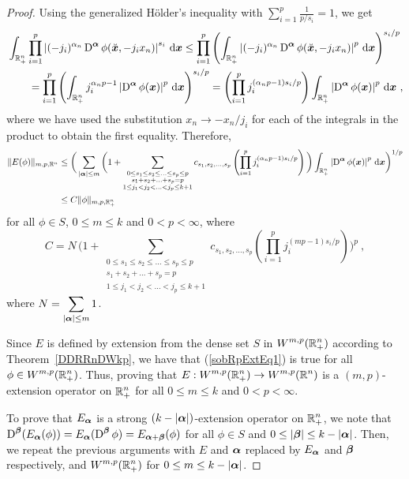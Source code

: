 \begin{proof}
Using the generalized Hölder's inequality with
$\displaystyle \sum_{i=1}^p \frac{1}{p/s_i} = 1$, we get
\begin{align*}
&\int_{\mathbb{R}^n_+} \prod_{i=1}^p \left| (-j_i)^{\alpha_n} \operatorname{D}^{{\bm{\alpha}}}
\phi(\breve{{\bm{x}}},-j_i x_n)\right|^{s_i} \,\mathrm{d}{{\bm{x}}}
\leq \prod_{i=1}^p \left( \int_{\mathbb{R}^n_+} \left| (-j_i)^{\alpha_n}
\operatorname{D}^{{\bm{\alpha}}}
\phi(\breve{{\bm{x}}},-j_i x_n)\right|^p \,\mathrm{d}{{\bm{x}}} \right)^{s_i/p} \\
&\qquad = \prod_{i=1}^p \left( \int_{\mathbb{R}^n_+} j_i^{\alpha_n p-1} \left|
 \operatorname{D}^{{\bm{\alpha}}} \phi({\bm{x}})\right|^p \,\mathrm{d}{{\bm{x}}} \right)^{s_i/p}
= \left( \prod_{i=1}^p j_i^{(\alpha_n p-1)s_i/p} \right) 
\int_{\mathbb{R}^n_+} \left| \operatorname{D}^{{\bm{\alpha}}} \phi({\bm{x}})\right|^p \,\mathrm{d}{{\bm{x}}} \ ,
\end{align*}
where we have used the substitution $x_n \to -x_n/j_i$ for each of the
integrals in the product to obtain the first equality.  Therefore,
\begin{align}
\| E(\phi) \|_{m,p,\mathbb{R}^n}
&\leq \bigg( \sum_{|{\bm{\alpha}}|\leq m} \bigg( 1
+ \sum_{\substack{0\leq s_1 \leq s_2 \leq \ldots \leq s_p \leq p\\
  s_1+s_2+\ldots+s_p = p\\
  1\leq j_1 < j_2 < \ldots <j_p \leq k+1}} c_{s_1,s_2,\ldots,s_p}
\left( \prod_{i=1}^p j_i^{(\alpha_n p-1)s_i/p} \right) \bigg) 
\int_{\mathbb{R}^n_+} \left| \operatorname{D}^{{\bm{\alpha}}} \phi({\bm{x}}) \right|^p \,\mathrm{d}{{\bm{x}}}
  \bigg)^{1/p} \nonumber \\
& \leq C \| \phi \|_{m,p,\mathbb{R}^n_+} \label{sobRpExtEq1}
\end{align}
for all $\phi \in S$, $0\leq m \leq k$ and $0<p<\infty$, where
\[
C = N\, \bigg(
1 + \sum_{\substack{0\leq s_1 \leq s_2 \leq \ldots \leq s_p \leq p\\
s_1+s_2+\ldots+s_p = p\\
1\leq j_1 < j_2 < \ldots <j_p \leq k+1}} c_{s_1,s_2,\ldots,s_p}
\left( \prod_{i=1}^p j_i^{(m p-1)s_i/p} \right) \bigg)^p \ ,
\]
where $\displaystyle N = \sum_{|{\bm{\alpha}}|\leq m} 1$.

Since $E$ is defined by extension from the dense set $S$ in
$\displaystyle W^{m,p}(\mathbb{R}^n_+)$ according to Theorem~\ref{DDRRnDWkp},
we have that (\ref{sobRpExtEq1}) is true for all
$\displaystyle \phi \in W^{m,p}(\mathbb{R}^n_+)$.  Thus, proving that
$\displaystyle E: W^{m,p}(\mathbb{R}^n_+) \to W^{m,p}(\mathbb{R}^n)$ is a $(m,p)$-extension
operator on $\displaystyle \mathbb{R}^n_+$ for all
$0\leq m \leq k$ and $0<p<\infty$.

To prove that $E_{{\bm{\alpha}}}$ is a strong
$(k-|{\bm{\alpha}}|)$-extension operator on $\displaystyle \mathbb{R}^n_+$, we note that
$\displaystyle \operatorname{D}^{{\bm{\beta}}} (E_{{\bm{\alpha}}}(\phi))
= E_{{\bm{\alpha}}}(\operatorname{D}^{{\bm{\beta}}} \phi)
= E_{{\bm{\alpha}}+{\bm{\beta}}}(\phi)$ for all
$\phi \in S$ and $0\leq |{\bm{\beta}}| \leq k - |{\bm{\alpha}}|$.  Then,
we repeat the previous arguments with $E$ and ${\bm{\alpha}}$ replaced
by $E_{{\bm{\alpha}}}$ and ${\bm{\beta}}$ respectively, and
$\displaystyle W^{m,p}(\mathbb{R}^n_+)$ for $0 \leq m \leq k-|{\bm{\alpha}}|$.
\end{proof}

